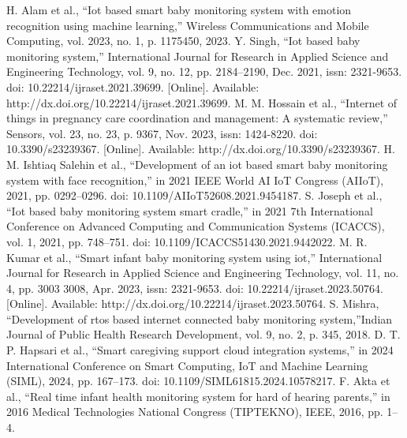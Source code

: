\documentclass[conference]{IEEEtran}
\begin{document}

\begin{thebibliography}{00}
 H. Alam et al., “Iot based smart baby monitoring system with emotion recognition using machine learning,” Wireless Communications and Mobile Computing, vol. 2023, no. 1, p. 1175450, 2023.
 Y. Singh, “Iot based baby monitoring system,” International  Journal for Research in Applied Science and Engineering Technology, vol. 9, no. 12, pp. 2184–2190, Dec. 2021, issn: 2321-9653. doi: 10.22214/ijraset.2021.39699. [Online]. Available: http://dx.doi.org/10.22214/ijraset.2021.39699.
 M. M. Hossain et al., “Internet of things in pregnancy care coordination and management: A systematic review,” Sensors, vol. 23, no. 23, p. 9367, Nov. 2023, issn: 1424-8220. doi: 10.3390/s23239367. [Online]. Available: http://dx.doi.org/10.3390/s23239367.
 H. M. Ishtiaq Salehin et al., “Development of an iot based smart baby monitoring system with face recognition,” in 2021 IEEE World AI IoT Congress (AIIoT), 2021, pp. 0292–0296. doi: 10.1109/AIIoT52608.2021.9454187.
 S. Joseph et al., “Iot based baby monitoring system smart cradle,” in 2021 7th International Conference on Advanced Computing and Communication Systems (ICACCS), vol. 1, 2021, pp. 748–751. doi: 10.1109/ICACCS51430.2021.9442022.
 M. R. Kumar et al., “Smart infant baby monitoring system using iot,” International Journal for Research in Applied Science and Engineering Technology, vol. 11, no. 4, pp. 3003 3008, Apr. 2023, issn: 2321-9653. doi: 10.22214/ijraset.2023.50764. [Online]. Available: http://dx.doi.org/10.22214/ijraset.2023.50764.
  S. Mishra, “Development of rtos based internet connected baby monitoring system,”Indian Journal of Public Health Research Development, vol. 9, no. 2, p. 345, 2018.
 D. T. P. Hapsari et al., “Smart caregiving support cloud integration systems,” in 2024 International Conference on Smart Computing, IoT and Machine Learning (SIML), 2024, pp. 167–173. doi: 10.1109/SIML61815.2024.10578217.
  F. Akta et al., “Real time infant health monitoring system for hard of hearing parents,” in 2016 Medical Technologies National Congress (TIPTEKNO), IEEE, 2016, pp. 1–4.
\end{thebibliography}

\end{document}
